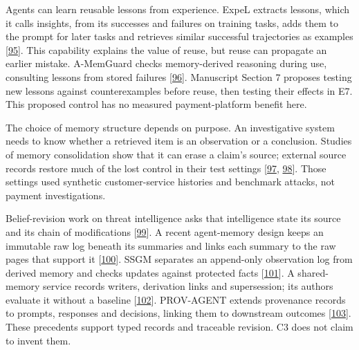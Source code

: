 \documentclass[
  11pt,
]{article}
\begin{document}
Agents can learn reusable lessons from experience. ExpeL extracts
lessons, which it calls insights, from its successes and failures on
training tasks, adds them to the prompt for later tasks and retrieves
similar successful trajectories as examples
{[}\protect\hyperlink{ref-Zhao2024ExpeL}{95}{]}. This capability
explains the value of reuse, but reuse can propagate an earlier mistake.
A-MemGuard checks memory-derived reasoning during use, consulting
lessons from stored failures
{[}\protect\hyperlink{ref-Wei2026AMemGuard}{96}{]}. Manuscript Section 7
proposes testing new lessons against counterexamples before reuse, then
testing their effects in E7. This proposed control has no measured
payment-platform benefit here.

The choice of memory structure depends on purpose. An investigative
system needs to know whether a retrieved item is an observation or a
conclusion. Studies of memory consolidation show that it can erase a
claim's source; external source records restore much of the lost control
in their test settings
{[}\protect\hyperlink{ref-Zhan2026AuthMemBench}{97},
\protect\hyperlink{ref-Xu2026PPMF}{98}{]}. Those settings used synthetic
customer-service histories and benchmark attacks, not payment
investigations.

Belief-revision work on threat intelligence asks that intelligence state
its source and its chain of modifications
{[}\protect\hyperlink{ref-Hettema2021Rationality}{99}{]}. A recent
agent-memory design keeps an immutable raw log beneath its summaries and
links each summary to the raw pages that support it
{[}\protect\hyperlink{ref-Zhu2026TierMem}{100}{]}. SSGM separates an
append-only observation log from derived memory and checks updates
against protected facts {[}\protect\hyperlink{ref-Lam2026SSGM}{101}{]}.
A shared-memory service records writers, derivation links and
supersession; its authors evaluate it without a baseline
{[}\protect\hyperlink{ref-Margalit2026GovernedMemory}{102}{]}.
PROV-AGENT extends provenance records to prompts, responses and
decisions, linking them to downstream outcomes
{[}\protect\hyperlink{ref-Souza2025ProvAgent}{103}{]}. These precedents
support typed records and traceable revision. C3 does not claim to
invent them.
\end{document}
